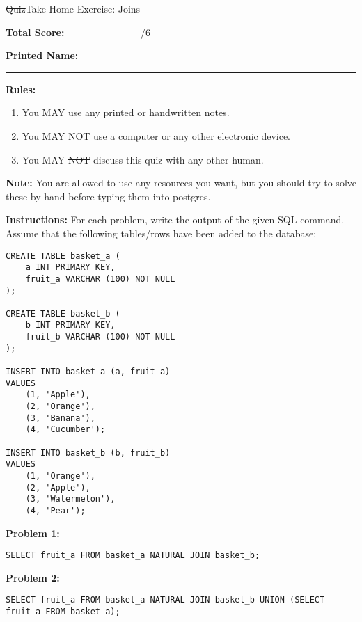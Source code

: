 \documentclass[10pt]{article}
\theoremstyle{definition}
\begin{document}
\begin{center}
{
\Large
    \sout{Quiz}Take-Home Exercise: Joins
}

    \vspace{0.1in}
\end{center}


\vspace{0.15in}
\noindent
\textbf{Total Score:} ~~~~~~~~~~~~~~~/6

\vspace{0.5in}
\noindent
\textbf{Printed Name:}

\noindent
\rule{\textwidth}{0.1pt}
\vspace{0.25in}

\noindent
\textbf{Rules:}
\begin{enumerate}
    \item You MAY use any printed or handwritten notes.
    \item You MAY \sout{NOT} use a computer or any other electronic device.
    \item You MAY \sout{NOT} discuss this quiz with any other human.
\end{enumerate}

\noindent
\textbf{Note:}
You are allowed to use any resources you want, but you should try to solve these by hand before typing them into postgres.

\vspace{0.25in}
\noindent
\textbf{Instructions:}
For each problem, write the output of the given SQL command.
Assume that the following tables/rows have been added to the database:
\begin{lstlisting}
CREATE TABLE basket_a (
    a INT PRIMARY KEY,
    fruit_a VARCHAR (100) NOT NULL
);

CREATE TABLE basket_b (
    b INT PRIMARY KEY,
    fruit_b VARCHAR (100) NOT NULL
);

INSERT INTO basket_a (a, fruit_a)
VALUES
    (1, 'Apple'),
    (2, 'Orange'),
    (3, 'Banana'),
    (4, 'Cucumber');

INSERT INTO basket_b (b, fruit_b)
VALUES
    (1, 'Orange'),
    (2, 'Apple'),
    (3, 'Watermelon'),
    (4, 'Pear');
\end{lstlisting}

\newpage
\textbf{Problem 1:}
\begin{lstlisting}
SELECT fruit_a FROM basket_a NATURAL JOIN basket_b;
\end{lstlisting}

\vspace{3in}
\textbf{Problem 2:}
\begin{lstlisting}
SELECT fruit_a FROM basket_a NATURAL JOIN basket_b UNION (SELECT fruit_a FROM basket_a);
\end{lstlisting}
\end{document}
